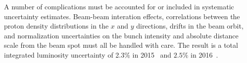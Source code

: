 A number of complications must be accounted for or included in systematic uncertainty estimates.
Beam-beam interation effects, correlations between the proton density distributions in the $x$ and $y$ directions, drifts in the beam orbit, and normalization uncertainties on the bunch intensity and absolute distance scale from the beam spot must all be handled with care.
The result is a total integrated luminosity uncertainty of 2.3\% in 2015~\cite{CMS-PAS-LUM-15-001} and $2.5\%$ in 2016~\cite{CMS-PAS-LUM-17-001}.
